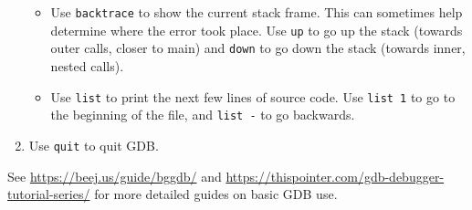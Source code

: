 \documentclass[12pt]{article}
\begin{document}
\begin{enumerate}
\begin{itemize}
            \item Use \texttt{backtrace} to show the current stack frame. This can sometimes help determine where the error took place. Use \texttt{up} to go up the stack (towards outer calls, closer to main) and \texttt{down} to go down the stack (towards inner, nested calls).
            \item Use \texttt{list} to print the next few lines of source code. Use \texttt{list 1} to go to the beginning of the file, and \texttt{list -} to go backwards.
        \end{itemize}
    \item Use \texttt{quit} to quit GDB.
\end{enumerate}

See \url{https://beej.us/guide/bggdb/} and \url{https://thispointer.com/gdb-debugger-tutorial-series/} for more detailed guides on basic GDB use.


\end{document}
